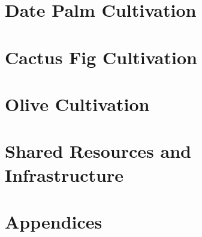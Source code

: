 \documentclass[12pt,a4paper]{report}
\begin{document}
\chapter{Date Palm Cultivation}









\chapter{Cactus Fig Cultivation}









\chapter{Olive Cultivation}









\chapter{Shared Resources and Infrastructure}









\chapter{Appendices}




\end{document}
